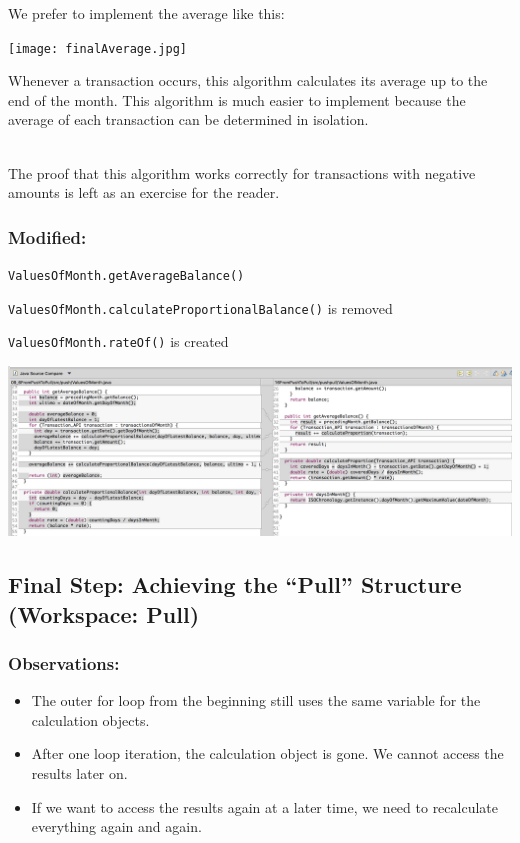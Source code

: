 \documentclass[a4paper,fleqn,titlepage,11pt]{article}
\begin{document}
We prefer to implement the average like this:

\texttt{[image: finalAverage.jpg]}

Whenever a transaction occurs, this algorithm calculates its average up to the end of the month. This algorithm is much easier to implement because the average of each transaction can be determined in isolation.
\\~

The proof that this algorithm works correctly for transactions with negative amounts is left as an exercise for the reader.

\subsubsection*{Modified:}

\texttt{ValuesOfMonth.getAverageBalance()}

\texttt{ValuesOfMonth.calculateProportionalBalance()} is removed

\texttt{ValuesOfMonth.rateOf()} is created

\includegraphics[width=1\textwidth]{CompareViews/15-16.png}


\subsection*{Final Step: Achieving the ``Pull'' Structure (Workspace: Pull)}

\subsubsection*{Observations:}

\begin{itemize}
\item The outer for loop from the beginning still uses the same variable for the calculation objects.
\item After one loop iteration, the calculation object is gone. We cannot access the results later on.
\item If we want to access the results again at a later time, we need to recalculate everything again and again.
\end{itemize}
\end{document}
